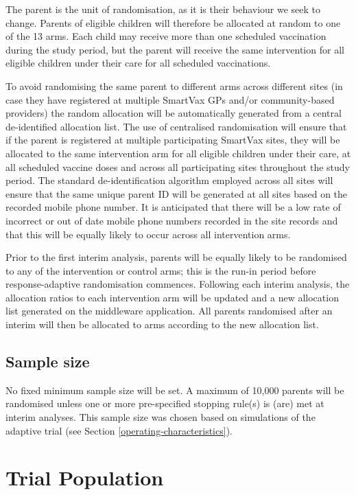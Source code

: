 \documentclass[
  bibliography=totoc]{scrreprt}
\begin{document}
The parent is the unit of randomisation, as it is their behaviour we seek to change.
Parents of eligible children will therefore be allocated at random to one of the 13 arms.
Each child may receive more than one scheduled vaccination during the study period, but the parent will receive the same intervention for all eligible children under their care for all scheduled vaccinations.

To avoid randomising the same parent to different arms across different sites (in case they have registered at multiple SmartVax GPs and/or community-based providers) the random allocation will be automatically generated from a central de-identified allocation list.
The use of centralised randomisation will ensure that if the parent is registered at multiple participating SmartVax sites, they will be allocated to the same intervention arm for all eligible children under their care, at all scheduled vaccine doses and across all participating sites throughout the study period.
The standard de-identification algorithm employed across all sites will ensure that the same unique parent ID will be generated at all sites based on the recorded mobile phone number.
It is anticipated that there will be a low rate of incorrect or out of date mobile phone numbers recorded in the site records and that this will be equally likely to occur across all intervention arms.

Prior to the first interim analysis, parents will be equally likely to be randomised to any of the intervention or control arms; this is the run-in period before response-adaptive randomisation commences.
Following each interim analysis, the allocation ratios to each intervention arm will be updated and a new allocation list generated on the middleware application.
All parents randomised after an interim will then be allocated to arms according to the new allocation list.

\hypertarget{sample-size}{%
\section{Sample size}\label{sample-size}}

No fixed minimum sample size will be set.
A maximum of 10,000 parents will be randomised unless one or more pre-specified stopping rule(s) is (are) met at interim analyses.
This sample size was chosen based on simulations of the adaptive trial (see Section \ref{operating-characteristics}).

\hypertarget{trial-population}{%
\chapter{Trial Population}\label{trial-population}}
\end{document}
